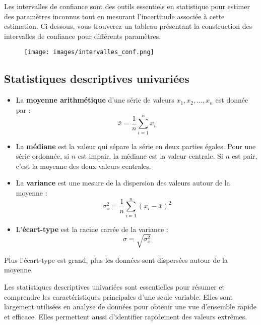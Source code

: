\documentclass[
  letterpaper,
  DIV=11,
  numbers=noendperiod]{scrartcl}
\begin{document}
Les intervalles de confiance sont des outils essentiels en statistique
pour estimer des paramètres inconnus tout en mesurant l'incertitude
associée à cette estimation. Ci-dessous, vous trouverez un tableau
présentant la construction des intervalles de confiance pour différents
paramètres.

\begin{figure}[H]
  \centering
  \texttt{[image: images/intervalles\_conf.png]}
\end{figure}

\subsection{Statistiques descriptives
univariées}\label{statistiques-descriptives-univariuxe9es}

\begin{itemize}
\item
  La \textbf{moyenne arithmétique} d'une série de valeurs
  \(x_1, x_2, \ldots, x_n\) est donnée par :
  \[\bar{x} = \frac{1}{n} \sum_{i=1}^{n} x_i\]
\item
  La \textbf{médiane} est la valeur qui sépare la série en deux parties
  égales. Pour une série ordonnée, si \(n\) est impair, la médiane est
  la valeur centrale. Si \(n\) est pair, c'est la moyenne des deux
  valeurs centrales.
\item
  La \textbf{variance} est une mesure de la dispersion des valeurs
  autour de la moyenne :
  \[\sigma_x^2 = \frac{1}{n} \sum_{i=1}^{n} (x_i - \bar{x})^2\]
\item
  L'\textbf{écart-type} est la racine carrée de la variance :
  \[\sigma = \sqrt{\sigma_x^2}\]
\end{itemize}

\begin{tcolorbox}[enhanced jigsaw, opacityback=0, toptitle=1mm, bottomtitle=1mm, rightrule=.15mm, colframe=quarto-callout-note-color-frame, leftrule=.75mm, titlerule=0mm, breakable, bottomrule=.15mm, colbacktitle=quarto-callout-note-color!10!white, coltitle=black, arc=.35mm, left=2mm, colback=white, toprule=.15mm, title=\textcolor{quarto-callout-note-color}{\faInfo}\hspace{0.5em}{Note}, opacitybacktitle=0.6]

Plus l'écart-type est grand, plus les données sont dispersées autour de
la moyenne.

\end{tcolorbox}

Les statistiques descriptives univariées sont essentielles pour résumer
et comprendre les caractéristiques principales d'une seule variable.
Elles sont largement utilisées en analyse de données pour obtenir une
vue d'ensemble rapide et efficace. Elles permettent aussi d'identifier
rapidement des valeurs extrêmes.
\end{document}
